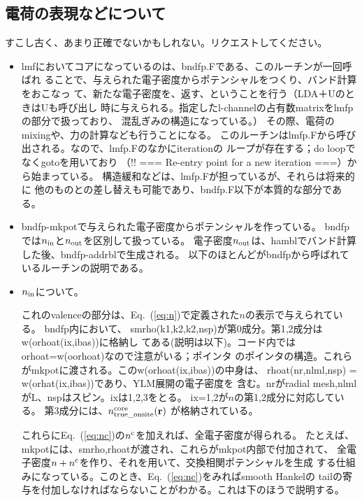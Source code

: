 \documentclass[twocolumn,showpacs,preprintnumbers,amsmath,amssymb,floatfix]{revtex4-1}
\newcommand{\bfr}{{\bf r}}
\newcommand{\req}[1]{\mbox{Eq.~\!(\ref{#1})}}
\begin{document}
\begin{widetext}
\section{電荷の表現などについて}

すこし古く、あまり正確でないかもしれない。リクエストしてください。
\begin{itemize}
\item
lmfにおいてコアになっているのは、bndfp.Fである、このルーチンが一回呼ばれ
ることで、与えられた電子密度からポテンシャルをつくり、バンド計算をおこなっ
て、新たな電子密度を、返す、ということを行う（LDA＋UのときはUも呼び出し
時に与えられる。指定したl-channelの占有数matrixをlmfpの部分で扱っており、
混乱ぎみの構造になっている。）
その際、電荷のmixingや、力の計算なども行うことになる。
このルーチンはlmfp.Fから呼び出される。なので、lmfp.Fのなかにiterationの
ループが存在する；do loopでなくgotoを用いており
（!! === Re-entry point for a new iteration ===）から始まっている。
構造緩和などは、lmfp.Fが担っているが、それらは将来的に
他のものとの差し替えも可能であり、bndfp.F以下が本質的な部分である。

\item 
bndfp-mkpotで与えられた電子密度からポテンシャルを作っている。
bndfpでは$n_{\rm in}$と$n_{\rm out}$を区別して扱っている。
電子密度$n_{\rm out}$は、hamblでバンド計算した後、bndfp-addrblで生成される。
以下のほとんどがbndfpから呼ばれているルーチンの説明である。

\item 
$n_{\rm in}$について。

これのvalenceの部分は、\req{eq:n}で定義された$n$の表示で与えられている。
bndfp内において、
smrho(k1,k2,k2,nsp)が第0成分。第1,2成分はw(orhoat(ix,ibas))に格納し
てある(説明は以下)。コード内ではorhoat=w(oorhoat)なので注意がいる；ポインタ
のポインタの構造。これらがmkpotに渡される。このw(orhoat(ix,ibas))の中身は、
rhoat(nr,nlml,nsp) = w(orhat(ix,ibas))であり、YLM展開の電子密度を
含む。nrがradial mesh,nlmlがL、nspはスピン。ixは1,2,3をとる。
ix=1,2が$n$の第1,2成分に対応している。
第3成分には、$ n^{\rm core}_{\rm true\_onsite}(\bfr)$
が格納されている。

これらに\req{eq:nc}の$n^{\rm c}$を加えれば、全電子密度が得られる。
たとえば、mkpotには、smrho,rhoatが渡され、これらがmkpot内部で付加されて、
全電子密度$n+n^{\rm c}$を作り、それを用いて、交換相関ポテンシャルを生成
する仕組みになっている。このとき、\req{eq:nc}をみればsmooth Hankelの
tailの寄与を付加しなければならないことがわかる。これは下のほうで説明する。


\end{itemize}
\end{widetext}
\end{document}
